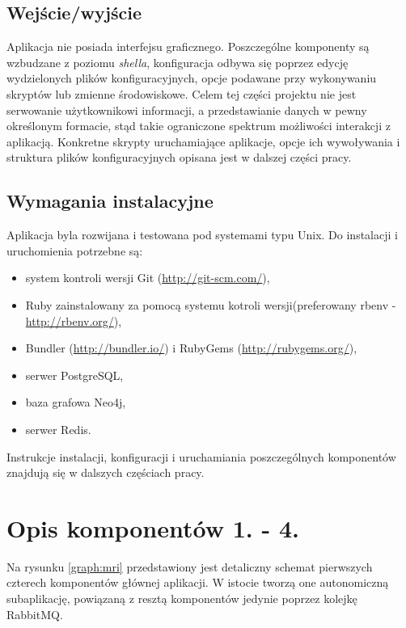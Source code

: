 \subsection{Wejście/wyjście}
\label{subsec:weWy}

Aplikacja nie posiada interfejsu graficznego. Poszczególne komponenty są wzbudzane z poziomu \emph{shella}, konfiguracja odbywa się poprzez edycję wydzielonych plików konfiguracyjnych, 
opcje podawane przy wykonywaniu skryptów lub zmienne środowiskowe. Celem tej części projektu nie jest serwowanie użytkownikowi informacji, a przedstawianie danych w pewny określonym
formacie, stąd takie ograniczone spektrum możliwości interakcji z aplikacją. Konkretne skrypty uruchamiające aplikacje, opcje ich wywoływania i struktura plików konfiguracyjnych opisana 
jest w dalszej części pracy.

\subsection{Wymagania instalacyjne}
\label{subs:wymaganiaInst}

Aplikacja byla rozwijana i testowana pod systemami typu Unix. Do instalacji i uruchomienia potrzebne są:
\begin{itemize}
\item system kontroli wersji Git (\url{http://git-scm.com/}),
\item Ruby zainstalowany za pomocą systemu kotroli wersji(preferowany rbenv - \url{http://rbenv.org/}),
\item Bundler (\url{http://bundler.io/}) i RubyGems (\url{http://rubygems.org/}),
\item serwer PostgreSQL,
\item baza grafowa Neo4j,
\item serwer Redis.
\end{itemize}

Instrukcje instalacji, konfiguracji i uruchamiania poszczególnych komponentów znajdują się w dalszych częściach pracy.

\section{Opis komponentów 1. - 4.}

Na rysunku \ref{graph:mri} przedstawiony jest detaliczny schemat pierwszych czterech komponentów głównej aplikacji. W istocie tworzą one autonomiczną subaplikację, powiązaną z resztą
komponentów jedynie poprzez kolejkę RabbitMQ. 

